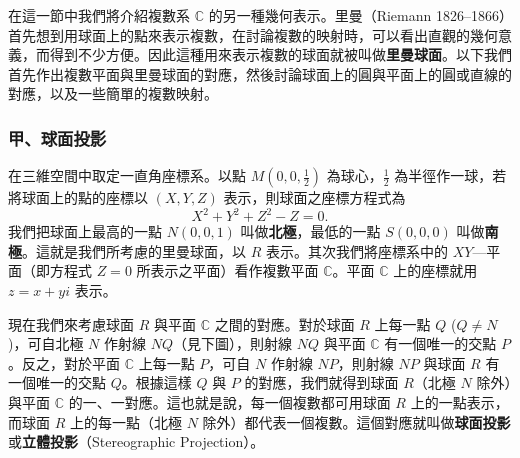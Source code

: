 在這一節中我們將介紹複數系 $\mathbb{C}$ 的另一種幾何表示。里曼（Riemann 1826--1866）首先想到用球面上的點來表示複數，在討論複數的映射時，可以看出直觀的幾何意義，而得到不少方便。因此這種用來表示複數的球面就被叫做\textbf{里曼球面}。以下我們首先作出複數平面與里曼球面的對應，然後討論球面上的圓與平面上的圓或直線的對應，以及一些簡單的複數映射。

\subsubsection*{甲、球面投影}

在三維空間中取定一直角座標系。以點 $M\left(0, 0, \frac{1}{2}\right)$ 為球心，$\frac{1}{2}$ 為半徑作一球，若將球面上的點的座標以 $(X, Y, Z)$ 表示，則球面之座標方程式為
\begin{equation}
X^2+Y^2+Z^2-Z = 0. \label{eq:ch5-sec4-1}
\end{equation}
我們把球面上最高的一點 $N(0, 0, 1)$ 叫做\textbf{北極}，最低的一點 $S(0, 0, 0)$ 叫做\textbf{南極}。這就是我們所考慮的里曼球面，以 $R$ 表示。其次我們將座標系中的 $XY$---平面（即方程式 $Z=0$ 所表示之平面）看作複數平面 $\mathbb{C}$。平面 $\mathbb{C}$ 上的座標就用 $z=x+yi$ 表示。

現在我們來考慮球面 $R$ 與平面 $\mathbb{C}$ 之間的對應。對於球面 $R$ 上每一點 $Q$ ($Q \neq N$)，可自北極 $N$ 作射線 $NQ$（見下圖），則射線 $NQ$ 與平面 $\mathbb{C}$ 有一個唯一的交點 $P$。反之，對於平面 $\mathbb{C}$ 上每一點 $P$，可自 $N$ 作射線 $NP$，則射線 $NP$ 與球面 $R$ 有一個唯一的交點 $Q$。根據這樣 $Q$ 與 $P$ 的對應，我們就得到球面 $R$（北極 $N$ 除外）與平面 $\mathbb{C}$ 的一、一對應。這也就是說，每一個複數都可用球面 $R$ 上的一點表示，而球面 $R$ 上的每一點（北極 $N$ 除外）都代表一個複數。這個對應就叫做\textbf{球面投影}或\textbf{立體投影}（Stereographic Projection）。


